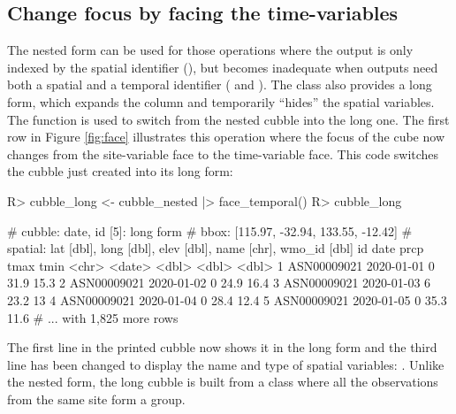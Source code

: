 \documentclass[
]{jss}
\begin{document}
\hypertarget{change-focus-by-facing-the-time-variables}{%
\subsection{Change focus by facing the time-variables}\label{change-focus-by-facing-the-time-variables}}

The nested form can be used for those operations where the output is only indexed by the spatial identifier (), but becomes inadequate when outputs need both a spatial and a temporal identifier ( and ). The  class also provides a long form, which expands the  column and temporarily ``hides'' the spatial variables. The function  is used to switch from the nested cubble into the long one. The first row in Figure \ref{fig:face} illustrates this operation where the focus of the cube now changes from the site-variable face to the time-variable face. This code switches the cubble just created into its long form:

\begin{CodeChunk}
\begin{CodeInput}
R> cubble_long <- cubble_nested |> face_temporal()
R> cubble_long
\end{CodeInput}
\begin{CodeOutput}
# cubble:  date, id [5]: long form
# bbox:    [115.97, -32.94, 133.55, -12.42]
# spatial: lat [dbl], long [dbl], elev [dbl], name [chr], wmo_id [dbl]
  id          date        prcp  tmax  tmin
  <chr>       <date>     <dbl> <dbl> <dbl>
1 ASN00009021 2020-01-01     0  31.9  15.3
2 ASN00009021 2020-01-02     0  24.9  16.4
3 ASN00009021 2020-01-03     6  23.2  13  
4 ASN00009021 2020-01-04     0  28.4  12.4
5 ASN00009021 2020-01-05     0  35.3  11.6
# ... with 1,825 more rows
\end{CodeOutput}
\end{CodeChunk}

The first line in the printed cubble now shows it in the long form and the third line has been changed to display the name and type of spatial variables: . Unlike the nested form, the long cubble is built from a  class where all the observations from the same site form a group.
\end{document}
